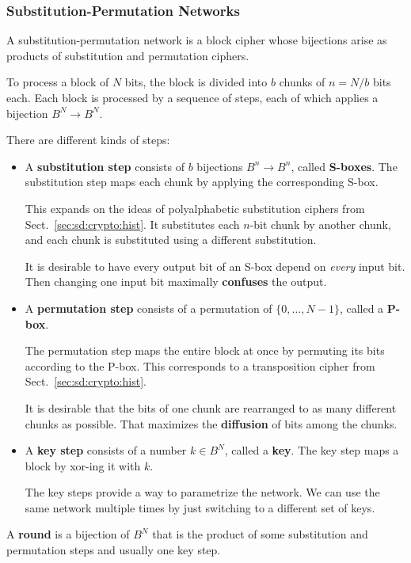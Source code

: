 \subsubsection{Substitution-Permutation Networks}

A substitution-permutation network is a block cipher whose bijections arise as products of substitution and permutation ciphers.

To process a block of $N$ bits, the block is divided into $b$ chunks of $n=N/b$ bits each.
Each block is processed by a sequence of steps, each of which applies a bijection $B^N\to B^N$.

There are different kinds of steps:
\begin{itemize}
\item A \textbf{substitution step} consists of $b$ bijections $B^n\to B^n$, called \textbf{S-boxes}.
The substitution step maps each chunk by applying the corresponding S-box.

This expands on the ideas of polyalphabetic substitution ciphers from Sect.~\ref{sec:sd:crypto:hist}.
It substitutes each $n$-bit chunk by another chunk, and each chunk is substituted using a different substitution.

It is desirable to have every output bit of an S-box depend on \emph{every} input bit.
Then changing one input bit maximally \textbf{confuses} the output.

\item A \textbf{permutation step} consists of a permutation of $\{0,\ldots,N-1\}$, called a \textbf{P-box}.

The permutation step maps the entire block at once by permuting its bits according to the P-box.
This corresponds to a transposition cipher from Sect.~\ref{sec:sd:crypto:hist}.

It is desirable that the bits of one chunk are rearranged to as many different chunks as possible.
That maximizes the \textbf{diffusion} of bits among the chunks.

\item A \textbf{key step} consists of a number $k\in B^N$, called a \textbf{key}.
The key step maps a block by xor-ing it with $k$.

The key steps provide a way to parametrize the network.
We can use the same network multiple times by just switching to a different set of keys.
\end{itemize}

A \textbf{round} is a bijection of $B^N$ that is the product of some substitution and permutation steps and usually one key step.

